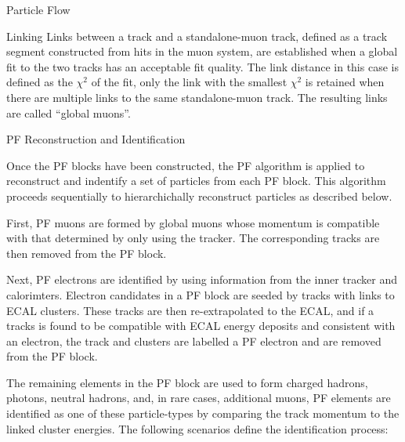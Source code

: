 \begin{section}{Particle Flow}
\begin{subsection}{Linking}
Links between a track and a standalone-muon track, defined as a track segment constructed from hits in the muon system, are established when a global fit to the two tracks has an acceptable fit quality.
The link distance in this case is defined as the $\chi^2$ of the fit, only the link with the smallest $\chi^2$ is retained when there are multiple links to the same standalone-muon track.
The resulting links are called ``global muons''.

\end{subsection}

\begin{subsection}{PF Reconstruction and Identification}

Once the PF blocks have been constructed, the PF algorithm is applied to reconstruct and indentify a set of particles from each PF block.
This algorithm proceeds sequentially to hierarchichally reconstruct particles as described below.

First, PF muons are formed by global muons whose momentum is compatible with that determined by only using the tracker.
The corresponding tracks are then removed from the PF block.

Next, PF electrons are identified by using information from the inner tracker and calorimters.
Electron candidates in a PF block are seeded by tracks with links to ECAL clusters.
These tracks are then re-extrapolated to the ECAL, and if a tracks is found to be compatible with ECAL energy deposits and consistent with an electron, the track and clusters are labelled a PF electron and are removed from the PF block.

The remaining elements in the PF block are used to form charged hadrons, photons, neutral hadrons, and, in rare cases, additional muons,
PF elements are identified as one of these particle-types by comparing the track momentum to the linked cluster energies.
The following scenarios define the identification process:


\end{subsection}
\end{section}
